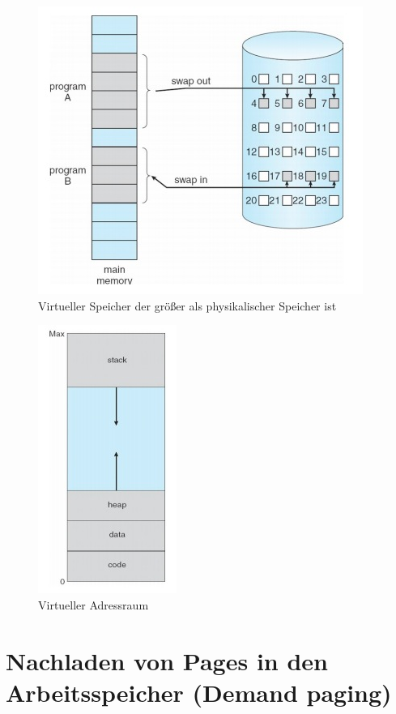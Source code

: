 \documentclass[a4paper]{scrreprt}
\begin{document}
\begin{figure}[ht]
\centering
\includegraphics[scale=0.5]{graphics/vmgtpm.png}
\caption{Virtueller Speicher der größer als physikalischer Speicher ist}
\end{figure}

\begin{figure}[ht]
\centering
\includegraphics[scale=0.5]{graphics/virtuelleradressraum.png}
\caption{Virtueller Adressraum}
\end{figure}

\section{Nachladen von Pages in den Arbeitsspeicher (Demand paging)}
\end{document}
